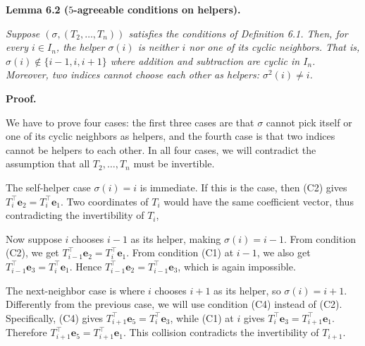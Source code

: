 \documentclass[10pt,a4paper]{article}
\begin{document}


\par\medskip\noindent\textbf{
\textbf{Lemma 6.2}\textbf{ }($5$-agreeable conditions on helpers)\textbf{.}
}\par



\emph{Suppose $(\sigma,(T_{2},\ldots,T_{n}))$ satisfies the conditions of Definition 6.1. Then, for every $i\in I_{n}$, the helper $\sigma(i)$ is neither $i$ nor one of its cyclic neighbors. That is,
$\sigma(i)\notin\{i-1,i,i+1\}$
where addition and subtraction are cyclic in $I_{n}$. Moreover, two indices cannot choose each other as helpers:
$\sigma^{2}(i)\neq i$.}\par






\par\medskip\noindent\textbf{Proof.}\par




We have to prove four cases: the first three cases are that $\sigma$ cannot pick itself or one of its cyclic neighbors as helpers, and the fourth case is that two indices cannot be helpers to each other. In all four cases, we will contradict the assumption that all $T_{2},\ldots,T_{n}$ must be invertible.\par




The self-helper case $\sigma(i)=i$ is immediate. If this is the case, then (C2) gives $T_{i}^{\top}\mathbf{e}_{2}=T_{i}^{\top}\mathbf{e}_{1}$. Two coordinates of $T_{i}$ would have the same coefficient vector, thus contradicting the invertibility of $T_{i}$,\par




Now suppose $i$ chooses $i-1$ as its helper, making $\sigma(i)=i-1$. From condition (C2), we get $T_{i-1}^{\top}\mathbf{e}_{2}=T_{i}^{\top}\mathbf{e}_{1}$. From condition (C1) at $i-1$, we also get $T_{i-1}^{\top}\mathbf{e}_{3}=T_{i}^{\top}\mathbf{e}_{1}$. Hence $T_{i-1}^{\top}\mathbf{e}_{2}=T_{i-1}^{\top}\mathbf{e}_{3}$, which is again impossible.\par




The next-neighbor case is where $i$ chooses $i+1$ as its helper, so $\sigma(i)=i+1$.
Differently from the previous case, we will use condition (C4) instead of (C2). Specifically, (C4) gives $T_{i+1}^{\top}\mathbf{e}_{5}=T_{i}^{\top}\mathbf{e}_{3}$, while (C1) at $i$ gives $T_{i}^{\top}\mathbf{e}_{3}=T_{i+1}^{\top}\mathbf{e}_{1}$. Therefore $T_{i+1}^{\top}\mathbf{e}_{5}=T_{i+1}^{\top}\mathbf{e}_{1}$. This collision contradicts the invertibility of $T_{i+1}$.\par
\end{document}

